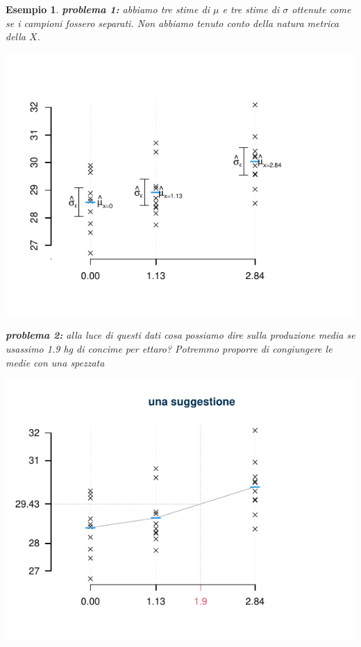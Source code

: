 \documentclass[
  11pt,
]{book}
\theoremstyle{mytheoremstyle}
\theoremstyle{mydefstyle}
\newtheorem{example}{{Esempio}}[section]
\begin{document}
\begin{example}
\textbf{problema 1:} abbiamo tre stime di \(\mu\) e tre stime di \(\sigma\) ottenute come se i campioni fossero separati.
Non abbiamo tenuto conto della natura metrica della \(X\).

\begin{center}\includegraphics{Appunti_di_Statistica_2025_files/figure-latex/17-regressione-I-13-1} \end{center}

\textbf{problema 2:} alla luce di questi dati cosa possiamo dire sulla produzione media se usassimo 1.9 hg di concime per ettaro?
Potremmo proporre di congiungere le medie con una spezzata

\begin{center}\includegraphics{Appunti_di_Statistica_2025_files/figure-latex/17-regressione-I-14-1} \end{center}

\end{example}
\end{document}
